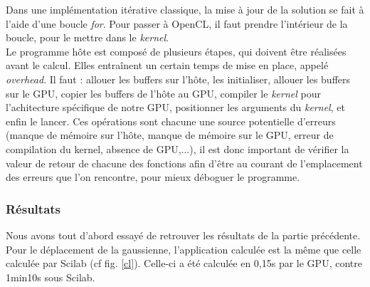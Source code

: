 \documentclass[12pt,a4paper,twoside]{article}
\begin{document}
Dans une implémentation itérative classique, la mise à jour de la solution se fait à l'aide d'une boucle \emph{for}. 
Pour passer à OpenCL, il faut prendre l'intérieur de la boucle, pour le mettre dans le \emph{kernel}. \\

Le programme hôte est composé de plusieurs étapes, qui doivent être réalisées avant le calcul. Elles entraînent
un certain temps de mise en place, appelé \emph{overhead}. Il faut : allouer les buffers sur l'hôte, les initialiser, allouer les buffers sur le GPU, copier les buffers de l'hôte au GPU, compiler le \emph{kernel} pour l'achitecture spécifique de notre GPU, positionner les arguments du \emph{kernel}, et enfin le lancer. Ces opérations sont
chacune une source potentielle d'erreurs (manque de mémoire sur l'hôte, manque de mémoire sur le GPU, erreur de compilation du kernel, absence de GPU,...), il est donc important de vérifier la valeur de retour de chacune des fonctions afin
d'être au courant de l'emplacement des erreurs que l'on rencontre, pour mieux déboguer le programme.

\subsubsection{Résultats}

Nous avons tout d'abord essayé de retrouver les résultats de la partie précédente.
Pour le déplacement de la gaussienne, l'application calculée est la même que celle calculée par Scilab (cf fig. \ref{cl}). Celle-ci a été calculée en 0,15s par le GPU, contre 1min10s sous Scilab.
\end{document}
